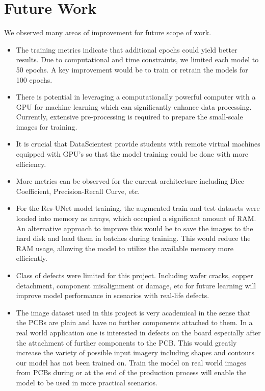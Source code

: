 \documentclass[12pt]{article}
\begin{document}
\section{Future Work}
We observed many areas of improvement for future scope of work. 
\begin{itemize}
    \item The training metrics indicate that additional epochs could yield better results. Due to computational and time constraints, we limited each model to 50 epochs. A key improvement would be to train or retrain the models for 100 epochs.
    \item There is potential in leveraging a computationally powerful computer with a GPU for machine learning which can significantly enhance data processing. Currently, extensive pre-processing is required to prepare the small-scale images for training.
    \item It is crucial that DataScientest provide students with remote virtual machines equipped with GPU's so that the model training could be done with more efficiency.
    \item More metrics can be observed for the current architecture including Dice Coefficient, Precision-Recall Curve, etc.  
    \item For the Res-UNet model training, the augmented train and test datasets were loaded into memory as arrays, which occupied a significant amount of RAM. An alternative approach to improve this would be to save the images to the hard disk and load them in batches during training. This would reduce the RAM usage, allowing the model to utilize the available memory more efficiently.
    \item Class of defects were limited for this project. Including wafer cracks, copper detachment, component misalignment or damage, etc for future learning will improve model performance in scenarios with real-life defects.
    \item The image dataset used in this project is very academical in the sense that the PCBs are plain and have no further components attached to them. In a real world application one is interested in defects on the board especially after the attachment of further components to the PCB. This would greatly increase the variety of possible input imagery including shapes and contours our model has not been trained on. Train the model on real world images from PCBs during or at the end of the production process will enable the model to be used in more practical scenarios.

\end{itemize}
\clearpage
\newpage
\end{document}

